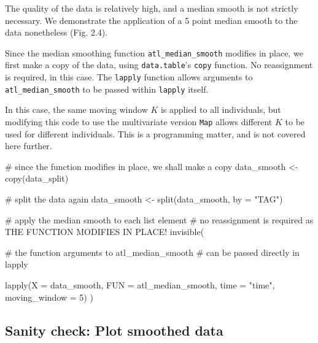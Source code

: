 \documentclass[]{scrreprt}
\newenvironment{Shaded}{}{}
\newcommand{\CommentTok}[1]{\textcolor[rgb]{0.00,0.50,0.00}{#1}}
\newcommand{\DataTypeTok}[1]{#1}
\newcommand{\DecValTok}[1]{#1}
\newcommand{\KeywordTok}[1]{\textcolor[rgb]{0.00,0.00,1.00}{#1}}
\newcommand{\NormalTok}[1]{#1}
\newcommand{\StringTok}[1]{\textcolor[rgb]{0.00,0.50,0.50}{#1}}
\begin{document}
The quality of the data is relatively high, and a median smooth is not strictly necessary. We demonstrate the application of a 5 point median smooth to the data nonetheless (Fig. 2.4).

Since the median smoothing function \texttt{atl\_median\_smooth} modifies in place, we first make a copy of the data, using \texttt{data.table}'s \texttt{copy} function.
No reassignment is required, in this case. The \texttt{lapply} function allows arguments to \texttt{atl\_median\_smooth} to be passed within \texttt{lapply} itself.

In this case, the same moving window \(K\) is applied to all individuals, but modifying this code to use the multivariate version \texttt{Map} allows different \(K\) to be used for different individuals. This is a programming matter, and is not covered here further.

\begin{Shaded}
\begin{Highlighting}[]
\CommentTok{# since the function modifies in place, we shall make a copy}
\NormalTok{data_smooth <-}\StringTok{ }\KeywordTok{copy}\NormalTok{(data_split)}

\CommentTok{# split the data again}
\NormalTok{data_smooth <-}\StringTok{ }\KeywordTok{split}\NormalTok{(data_smooth, }\DataTypeTok{by =} \StringTok{"TAG"}\NormalTok{)}
\end{Highlighting}
\end{Shaded}

\begin{Shaded}
\begin{Highlighting}[]
\CommentTok{# apply the median smooth to each list element}
\CommentTok{# no reassignment is required as THE FUNCTION MODIFIES IN PLACE!}
\KeywordTok{invisible}\NormalTok{(}
  
  \CommentTok{# the function arguments to atl_median_smooth}
  \CommentTok{# can be passed directly in lapply}
  
  \KeywordTok{lapply}\NormalTok{(}\DataTypeTok{X =}\NormalTok{ data_smooth, }
         \DataTypeTok{FUN =}\NormalTok{ atl_median_smooth,}
         \DataTypeTok{time =} \StringTok{"time"}\NormalTok{, }\DataTypeTok{moving_window =} \DecValTok{5}\NormalTok{)}
\NormalTok{)}
\end{Highlighting}
\end{Shaded}

\hypertarget{sanity-check-plot-smoothed-data}{%
\subsection{Sanity check: Plot smoothed data}\label{sanity-check-plot-smoothed-data}}
\end{document}
